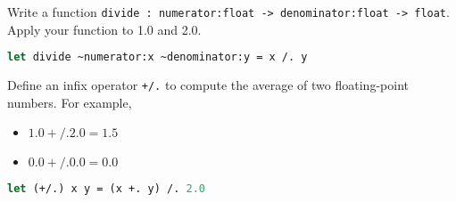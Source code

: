 \problem[divide]
Write a function \texttt{divide : numerator:float -> denominator:float -> float}. Apply your function to 1.0 and 2.0.

\begin{lstlisting}[language=Caml]
let divide ~numerator:x ~denominator:y = x /. y
\end{lstlisting}

\problem[average]
Define an infix operator \texttt{+/.} to compute the average of two floating-point numbers. For example,
\begin{itemize}
  \item $1.0 +/. 2.0 = 1.5$
  \item $0.0 +/. 0.0 = 0.0$
\end{itemize}

\begin{lstlisting}[language=Caml]
let (+/.) x y = (x +. y) /. 2.0
\end{lstlisting}